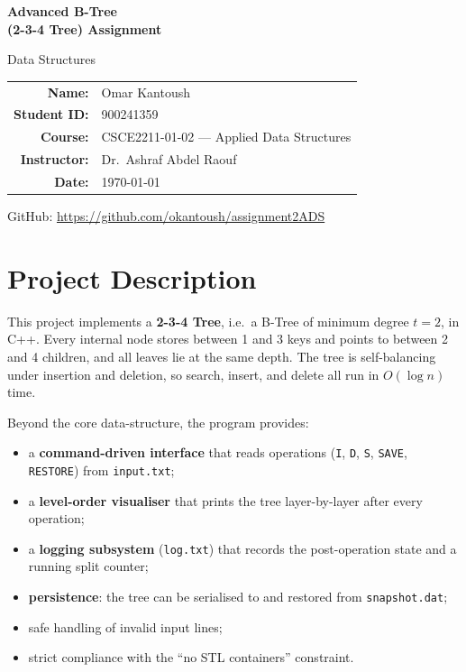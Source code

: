 \documentclass[11pt,a4paper]{article}
\begin{document}
\begin{titlepage}
\centering
\vspace*{2cm}
{\Huge\bfseries Advanced B-Tree\\[4pt]
(2-3-4 Tree) Assignment\par}
\vspace{1.2cm}
{\Large Data Structures\par}
\vspace{3cm}

\begin{tabular}{rl}
\textbf{Name:}      & Omar Kantoush \\[6pt]
\textbf{Student ID:}& 900241359 \\[6pt]
\textbf{Course:}    & CSCE2211-01-02 --- Applied Data Structures \\[6pt]
\textbf{Instructor:}& Dr.\ Ashraf Abdel Raouf \\[6pt]
\textbf{Date:}      & \today
\end{tabular}

\vfill
{\large GitHub: \url{https://github.com/okantoush/assignment2ADS}\par}
\end{titlepage}

\tableofcontents
\newpage

\section{Project Description}

This project implements a \textbf{2-3-4 Tree}, i.e.\ a B-Tree of minimum degree $t = 2$, in C++. Every internal node stores between 1 and 3 keys and points to between 2 and 4 children, and all leaves lie at the same depth. The tree is self-balancing under insertion and deletion, so search, insert, and delete all run in $O(\log n)$ time.

Beyond the core data-structure, the program provides:
\begin{itemize}[leftmargin=1.3em,itemsep=0pt]
    \item a \textbf{command-driven interface} that reads operations (\texttt{I}, \texttt{D}, \texttt{S}, \texttt{SAVE}, \texttt{RESTORE}) from \texttt{input.txt};
    \item a \textbf{level-order visualiser} that prints the tree layer-by-layer after every operation;
    \item a \textbf{logging subsystem} (\texttt{log.txt}) that records the post-operation state and a running split counter;
    \item \textbf{persistence}: the tree can be serialised to and restored from \texttt{snapshot.dat};
    \item safe handling of invalid input lines;
    \item strict compliance with the ``no STL containers'' constraint.
\end{itemize}
\end{document}
